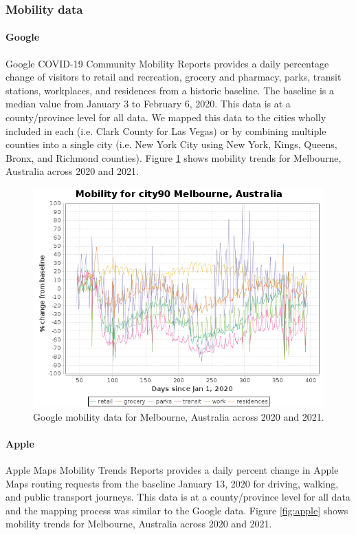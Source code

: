 \documentclass[final,3p,times,authoryear]{elsarticle}
\begin{document}
\subsubsection{Mobility data}
\paragraph{Google}

Google COVID-19 Community Mobility Reports \citep{Google2020} provides a  daily percentage change of visitors to retail and recreation, grocery and pharmacy, parks, transit stations, workplaces, and residences from a historic baseline. The baseline is a median value from January 3 to February 6, 2020. This data is at a county/province level for all data. We mapped this data to the cities wholly included in each (i.e. Clark County for Las Vegas) or by combining multiple counties into a single city (i.e. New York City using New York, Kings, Queens, Bronx, and Richmond counties). Figure \ref{fig:googlemobility} shows mobility trends for Melbourne, Australia across 2020 and 2021.

\begin{figure}
\centering
\includegraphics[width=.99\linewidth]{images/city90MelbourneAustralia.png}
\caption{Google mobility data for Melbourne, Australia across 2020 and 2021.}
 \label{fig:googlemobility}
\end{figure}


\paragraph{Apple}
Apple Maps Mobility Trends Reports \citep{Apple2020} provides a daily percent change in Apple Maps routing requests from the baseline January 13, 2020 for driving, walking, and public transport journeys. This data is at a county/province level for all data and the mapping process was similar to the Google data. Figure \ref{fig:apple} shows mobility trends for Melbourne, Australia across 2020 and 2021.
\end{document}
